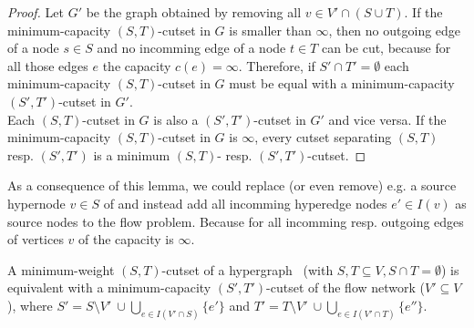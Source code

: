 \begin{proof}
Let $G'$ be the graph obtained by removing all $v \in V' \cap (S \cup T)$. If
the minimum-capacity $(S,T)$-cutset in $G$ is smaller than $\infty$, then no outgoing
edge of a node $s \in S$ and no incomming edge of a node $t \in T$ can be cut, because for all
those edges $e$ the capacity $c(e) = \infty$. Therefore, if $S' \cap T' = \emptyset$ each
minimum-capacity $(S,T)$-cutset in $G$ must be equal with a minimum-capacity $(S',T')$-cutset
in $G'$. \\
Each $(S,T)$-cutset in $G$ is also a $(S',T')$-cutset in $G'$ and vice versa.
If the minimum-capacity $(S,T)$-cutset in $G$ is $\infty$, every cutset separating
$(S,T)$ resp. $(S',T')$ is a minimum $(S,T)$- resp. $(S',T')$-cutset.
\end{proof}

As a consequence of this lemma, we could replace (or even remove) 
e.g. a source hypernode $v \in S$ of  and instead add all
incomming hyperedge nodes $e' \in I(v)$ as source nodes to the flow 
problem. Because for all incomming resp. outgoing edges of vertices $v$ of 
 the capacity is $\infty$.

\begin{theorem}
\label{theorem:st_cutset_equal}
A minimum-weight $(S,T)$-cutset of a hypergraph \HypergraphDef~(with $S,T \subseteq V,
S \cap T = \emptyset$) is equivalent with a minimum-capacity $(S',T')$-cutset of the
flow network  ($V' \subseteq V$), where $S' = S \setminus V'\ \cup \bigcup\limits_{e \in I(V' \cap S)} \{e'\}$ and 
$T' = T \setminus V'\ \cup \bigcup\limits_{e \in I(V'\cap T)} \{e''\}$.
\label{theorem:heuer_network}
\end{theorem}

